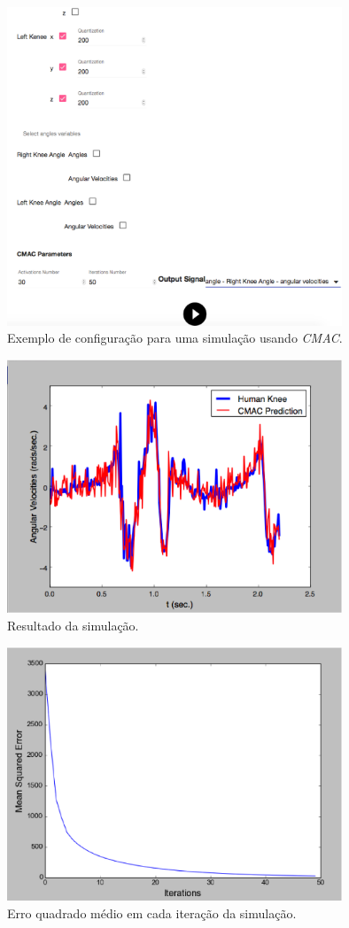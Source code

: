 \begin{figure}[ht]
	\centering
	\includegraphics[width=10cm]{figuras/tela31.eps}
	\caption{Exemplo de configuração para uma simulação usando \emph{CMAC}.}
\label{tela31}
\end{figure}

\begin{figure}[ht]
	\centering
	\includegraphics[width=10cm]{figuras/tela32.eps}
	\caption{Resultado da simulação.}
\label{tela32}
\end{figure}

\begin{figure}[ht]
	\centering
	\includegraphics[width=10cm]{figuras/tela33.eps}
	\caption{Erro quadrado médio em cada iteração da simulação.}
\label{tela33}
\end{figure}

